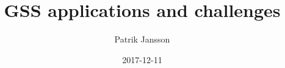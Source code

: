\usepackage[utf8]{inputenc}
\usepackage{color}
\geometry{paperwidth=140mm,paperheight=105mm}
\usepackage{pgf}
\usepackage{tikz}


\author{Patrik Jansson}
\title{GSS applications and challenges}
\date{2017-12-11}
\newcommand{\instlogo}{}%

\newcommand{\GSSpaper}{\raisebox{-0.5\height}{\texttt{[image: ../ref/GSS\_SynthesisPaper\_2013-06-07\_frontpage.png]}}}

{
\begin{frame}\titlepage\end{frame}
}
